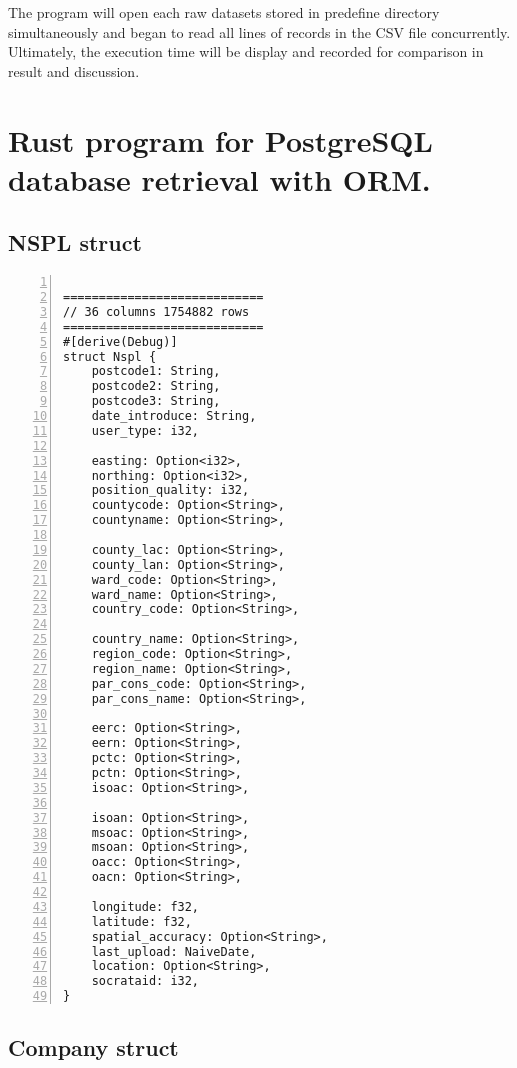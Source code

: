 The program will open each raw datasets stored in predefine directory simultaneously and began to read all lines of records in the CSV file concurrently. Ultimately, the execution time will be display and recorded for comparison in result and discussion. 

\newpage

\section{Rust program for PostgreSQL database retrieval with ORM.}

\subsection{NSPL struct}
\lstset{basicstyle=\ttfamily\tiny}  
\begin{lstlisting}[breaklines, frame=single, numbers=left, caption={Source code for NSPL struct. (nspl.rs)}, label=commandline-02]

============================
// 36 columns 1754882 rows 
============================
#[derive(Debug)]
struct Nspl {
	postcode1: String,
	postcode2: String,
	postcode3: String,
	date_introduce: String,
	user_type: i32,
	
	easting: Option<i32>,
	northing: Option<i32>,
	position_quality: i32,
	countycode: Option<String>,
	countyname: Option<String>,
	
	county_lac: Option<String>,
	county_lan: Option<String>,
	ward_code: Option<String>,
	ward_name: Option<String>,
	country_code: Option<String>,
	
	country_name: Option<String>,
	region_code: Option<String>,
	region_name: Option<String>,
	par_cons_code: Option<String>,
	par_cons_name: Option<String>,
	
	eerc: Option<String>,
	eern: Option<String>,
	pctc: Option<String>,
	pctn: Option<String>,
	isoac: Option<String>,
	
	isoan: Option<String>,
	msoac: Option<String>,
	msoan: Option<String>,
	oacc: Option<String>,
	oacn: Option<String>,
	
	longitude: f32,
	latitude: f32,
	spatial_accuracy: Option<String>,
	last_upload: NaiveDate,
	location: Option<String>,
	socrataid: i32,
}

\end{lstlisting}

\newpage

\subsection{Company struct}


